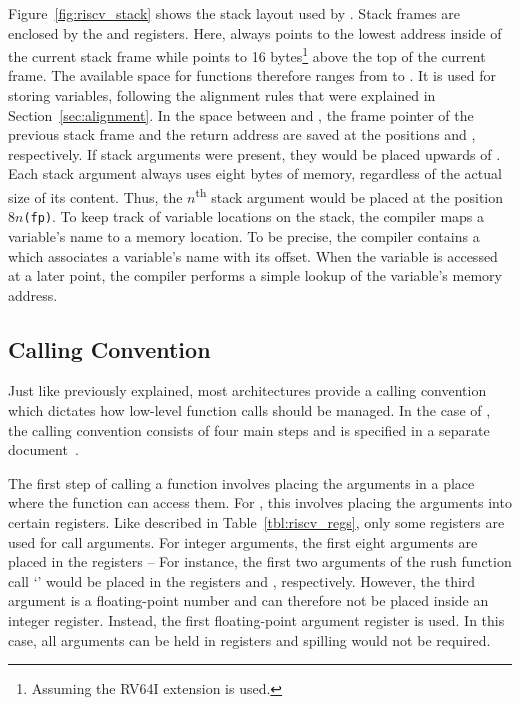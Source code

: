 Figure~\ref{fig:riscv_stack} shows the stack layout used by \riscv{}.
Stack frames are enclosed by the  and  registers.
Here,  always points to the lowest address inside of the current stack frame while
 points to 16 bytes\footnote{Assuming the RV64I extension is used.} above the top of the current frame.
The available space for functions therefore ranges from  to .
It is used for storing variables, following the alignment rules that were explained in Section~\ref{sec:alignment}.
In the space between  and , the frame pointer of the previous stack frame and the return address are saved at the positions \mbox{} and , respectively.
If stack arguments were present, they would be placed upwards of .
Each stack argument always uses eight bytes of memory, regardless of the actual size of its content.
Thus, the $n$\textsuperscript{th} stack argument would be placed at the position $8n$\texttt{(fp)}.
To keep track of variable locations on the stack, the compiler maps a variable's name to a memory location.
To be precise, the compiler contains a  which associates a variable's name with its  offset.
When the variable is accessed at a later point, the compiler performs a simple lookup of the variable's memory address.

\subsection{Calling Convention}\label{sec:riscv_calling_conv}

Just like previously explained, most architectures provide a calling convention which dictates how low-level function calls should be managed.
In the case of \riscv{}, the calling convention consists of four main steps and is specified in a separate document~\cite{RiscvABI2022}.

The first step of calling a function involves placing the arguments in a place where the function can access them.
For \riscv{}, this involves placing the arguments into certain registers.
Like described in Table~\ref{tbl:riscv_regs}, only some registers are used for call arguments.
For integer arguments, the first eight arguments are placed in the registers --
For instance, the first two arguments of the rush function call `' would be placed in the registers  and , respectively.
However, the third argument is a floating-point number and can therefore not be placed inside an integer register.
Instead, the first floating-point argument register  is used.
In this case, all arguments can be held in registers and spilling would not be required.

